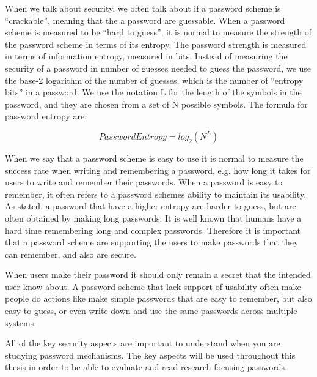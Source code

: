     When we talk about security, we often talk about if a password scheme is ``crackable'', meaning that the a password are guessable. When a password scheme is measured to be ``hard to guess'', it is normal to measure the strength of the password scheme in terms of its entropy. The password strength is measured in terms of information entropy, measured in bits. Instead of measuring the security of a password in number of guesses needed to guess the password, we use the base-2 logarithm of the number of guesses, which is the number of ``entropy bits'' in a password. We use the notation L for the length of the symbols in the password, and they are chosen from a set of N possible symbols. The formula for password entropy are:

      \begin{equation}
        Password Entropy = log_{2}(N^{L})
      \end{equation}

    When we say that a password scheme is easy to use it is normal to measure the success rate when writing and remembering a password, e.g. how long it takes for users to write and remember their passwords. When a password is easy to remember, it often refers to a password schemes ability to maintain its usability. As stated, a password that have a higher entropy are harder to guess, but are often obtained by making long passwords. It is well known that humans have a hard time remembering long and complex passwords. Therefore it is important that a password scheme are supporting the users to make passwords that they can remember, and also are secure. 

    When users make their password it should only remain a secret that the intended user know about. A password scheme that lack support of usability often make people do actions like make simple passwords that are easy to remember, but also easy to guess, or even write down and use the same passwords across multiple systems. 

    All of the key security aspects are important to understand when you are studying password mechanisms. The key aspects will be used throughout this thesis in order to be able to evaluate and read research focusing passwords. 




